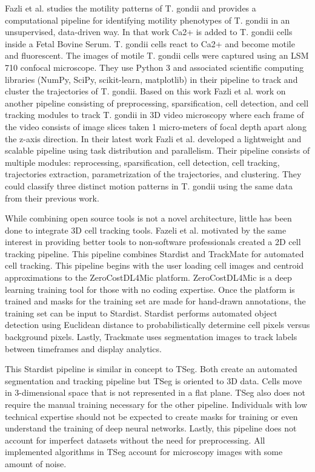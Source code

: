 \documentclass[./dissertation.tex]{subfiles}
\begin{document}
Fazli et al. \cite{fazli2018unsupervised} studies the motility patterns of T. gondii and provides a computational pipeline for identifying motility phenotypes of T. gondii in an unsupervised, data-driven way. In that work Ca2+ is added to T. gondii cells inside a Fetal Bovine Serum. T. gondii cells react to Ca2+ and become motile and fluorescent. The images of motile T. gondii cells were captured using an LSM 710 confocal microscope. They use Python 3 and associated scientific computing libraries (NumPy, SciPy, scikit-learn, matplotlib) in their pipeline to track and cluster the trajectories of T. gondii. Based on this work Fazli et al. \cite{fazli2018toward} work on another pipeline consisting of preprocessing, sparsification, cell detection, and cell tracking modules to track T. gondii in 3D video microscopy where each frame of the video consists of image slices taken 1 micro-meters of focal depth apart along the z-axis direction. In their latest work Fazli et al. \cite{fazli2019lightweight} developed a lightweight and scalable pipeline using task distribution and parallelism. Their pipeline consists of multiple modules: reprocessing, sparsification, cell detection, cell tracking, trajectories extraction, parametrization of the trajectories, and clustering. They could classify three distinct motion patterns in T. gondii using the same data from their previous work.

While combining open source tools is not a novel architecture, little has been done to integrate 3D cell tracking tools. Fazeli et al. \cite{fazeli2020automated} motivated by the same interest in providing better tools to non-software professionals created a 2D cell tracking pipeline. This pipeline combines Stardist \cite{Weigert_2020} and TrackMate \cite{TINEVEZ201780} for automated cell tracking. This pipeline begins with the user loading cell images and centroid approximations to the ZeroCostDL4Mic \cite{von2021democratising} platform. ZeroCostDL4Mic is a deep learning training tool for those with no coding expertise. Once the platform is trained and masks for the training set are made for hand-drawn annotations, the training set can be input to Stardist. Stardist performs automated object detection using Euclidean distance to probabilistically determine cell pixels versus background pixels. Lastly, Trackmate uses segmentation images to track labels between timeframes and display analytics.

This Stardist pipeline is similar in concept to TSeg. Both create an automated segmentation and tracking pipeline but TSeg is oriented to 3D data. Cells move in 3-dimensional space that is not represented in a flat plane. TSeg also does not require the manual training necessary for the other pipeline. Individuals with low technical expertise should not be expected to create masks for training or even understand the training of deep neural networks. Lastly, this pipeline does not account for imperfect datasets without the need for preprocessing. All implemented algorithms in TSeg account for microscopy images with some amount of noise.
\end{document}
